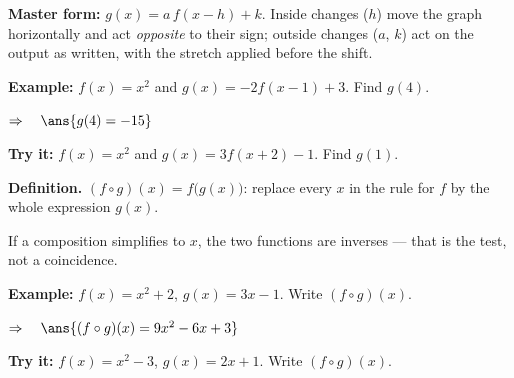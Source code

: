 \documentclass[12pt]{article}
\begin{document}


\begin{formulabox}
\textbf{Master form:} $g(x) = a\,f(x - h) + k$. Inside changes ($h$) move the graph horizontally and act \emph{opposite} to their sign; outside changes ($a$, $k$) act on the output as written, with the stretch applied before the shift.
\end{formulabox}

\begin{examplebox}
\textbf{Example:} \quad $f(x) = x^{2}$ and $g(x) = -2f(x - 1) + 3$. Find $g(4)$.

$\Rightarrow\quad \ans{g(4) = -15}$
\end{examplebox}

\begin{tryitbox}
\textbf{Try it:} \quad $f(x) = x^{2}$ and $g(x) = 3f(x + 2) - 1$. Find $g(1)$.\\[2pt]
\end{tryitbox}


\begin{formulabox}
\textbf{Definition.} $(f \circ g)(x) = f\bigl(g(x)\bigr)$: replace every $x$ in the rule for $f$ by the whole expression $g(x)$.\par
If a composition simplifies to $x$, the two functions are inverses --- that is the test, not a coincidence.
\end{formulabox}

\begin{examplebox}
\textbf{Example:} \quad $f(x) = x^{2} + 2$, $g(x) = 3x - 1$. Write $(f \circ g)(x)$.

$\Rightarrow\quad \ans{(f \circ g)(x) = 9x^{2} - 6x + 3}$
\end{examplebox}

\begin{tryitbox}
\textbf{Try it:} \quad $f(x) = x^{2} - 3$, $g(x) = 2x + 1$. Write $(f \circ g)(x)$.\\[2pt]
\end{tryitbox}
\end{document}
